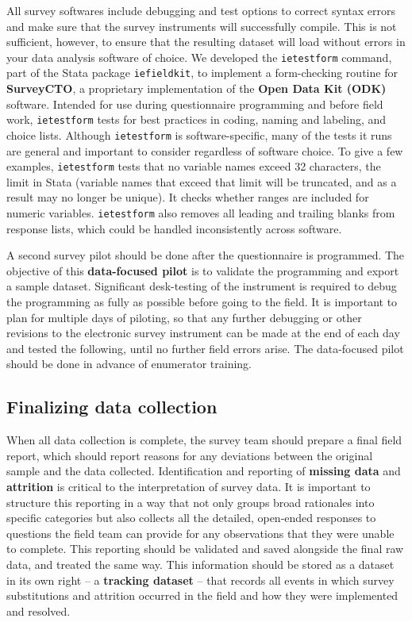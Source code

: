 All survey softwares include debugging and test options
to correct syntax errors and make sure that the survey instruments will successfully compile.
This is not sufficient, however, to ensure that the resulting dataset
will load without errors in your data analysis software of choice.
We developed the \texttt{ietestform} command,
part of the Stata package \texttt{iefieldkit},
to implement a form-checking routine for \textbf{SurveyCTO},
a proprietary implementation of the \textbf{Open Data Kit (ODK)} software.
Intended for use during questionnaire programming and before field work,
\texttt{ietestform} tests for best practices in coding, naming and labeling, and choice lists.
Although \texttt{ietestform} is software-specific,
many of the tests it runs are general and important to consider regardless of software choice.
To give a few examples, \texttt{ietestform} tests that no variable names exceed
32 characters, the limit in Stata (variable names that exceed that limit will
be truncated, and as a result may no longer be unique).
It checks whether ranges are included for numeric variables.
\texttt{ietestform} also removes all leading and trailing blanks from response lists,
which could be handled inconsistently across software.

A second survey pilot should be done after the questionnaire is programmed.
The objective of this \textbf{data-focused pilot}
is to validate the programming and export a sample dataset.
Significant desk-testing of the instrument is required to debug the programming
as fully as possible before going to the field.
It is important to plan for multiple days of piloting,
so that any further debugging or other revisions to the electronic survey instrument
can be made at the end of each day and tested the following, until no further field errors arise.
The data-focused pilot should be done in advance of enumerator training.


\subsection{Finalizing data collection}

When all data collection is complete, the survey team should prepare a final field report,
which should report reasons for any deviations between the original sample and the data collected.
Identification and reporting of \textbf{missing data} and \textbf{attrition}
is critical to the interpretation of survey data.
It is important to structure this reporting in a way that not only
groups broad rationales into specific categories
but also collects all the detailed, open-ended responses
to questions the field team can provide for any observations that they were unable to complete.
This reporting should be validated and saved alongside the final raw data, and treated the same way.
This information should be stored as a dataset in its own right
-- a \textbf{tracking dataset} -- that records all events in which survey substitutions
and attrition occurred in the field and how they were implemented and resolved.



